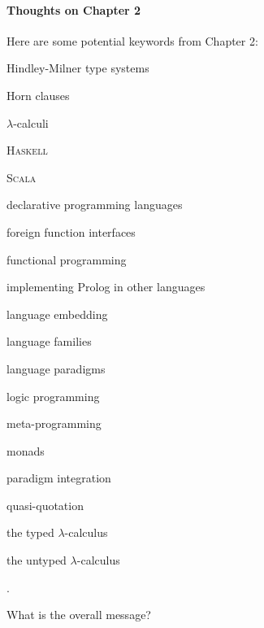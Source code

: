 \begin{scope}
\paragraph{Thoughts on Chapter 2}

Here are some potential keywords from Chapter 2:
\begin{inparaitem}
\item Hindley-Milner type systems
\item Horn clauses
\item \(\lambda\)-calculi
\item \textsc{Haskell}
\item \textsc{Scala}
\item declarative programming languages
\item foreign function interfaces
\item functional programming
\item implementing Prolog in other languages
\item language embedding
\item language families
\item language paradigms
\item logic programming
\item meta-programming
\item monads
\item paradigm integration
\item quasi-quotation
\item the typed \(\lambda\)-calculus
\item the untyped \(\lambda\)-calculus
\end{inparaitem}.

What is the overall message?


\end{scope}

